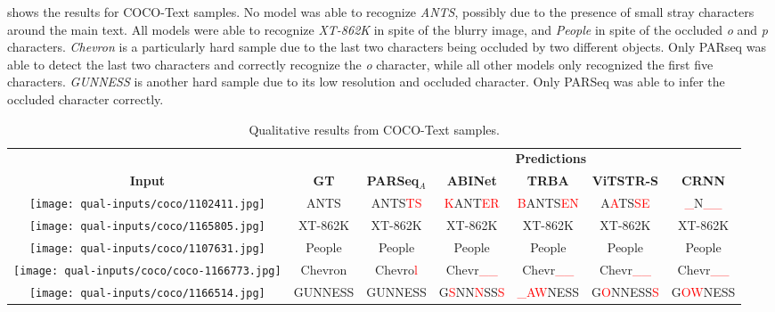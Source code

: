  shows the results for COCO-Text samples. No model was able to recognize \textit{ANTS}, possibly due to the presence of small stray characters around the main text. All models were able to recognize \textit{XT-862K} in spite of the blurry image, and \textit{People} in spite of the occluded \textit{o} and \textit{p} characters. \textit{Chevron} is a particularly hard sample due to the last two characters being occluded by two different objects. Only PARseq was able to detect the last two characters and correctly recognize the \textit{o} character, while all other models only recognized the first five characters. \textit{GUNNESS} is another hard sample due to its low resolution and occluded character. Only PARSeq was able to infer the occluded character correctly.

\begin{table*}[htb]
  \centering
  \scriptsize
  \setlength\tabcolsep{3pt}
  \caption{Qualitative results from COCO-Text samples.}
  \begin{tabular}{ c c c c c c c }
    \toprule
    & & \multicolumn{5}{c}{\textbf{Predictions}} \\
    \cmidrule{3-7}
    \textbf{Input} & \textbf{GT} & \textbf{PARSeq$_A$} & \textbf{ABINet} & \textbf{TRBA} & \textbf{ViTSTR-S} & \textbf{CRNN} \\
    \midrule
    \texttt{[image: qual-inputs/coco/1102411.jpg]} & ANTS & ANTS\textcolor{red}{TS} & \textcolor{red}{K}ANT\textcolor{red}{ER} & \textcolor{red}{B}ANTS\textcolor{red}{EN} & A\textcolor{red}{A}TS\textcolor{red}{SE} & 
    \textcolor{red}{\_}N\textcolor{red}{\_\_} \\
    \texttt{[image: qual-inputs/coco/1165805.jpg]} & XT-862K & XT-862K & XT-862K & XT-862K & XT-862K & XT-862K \\
    \texttt{[image: qual-inputs/coco/1107631.jpg]} & People & People & People & People & People & People \\
    \texttt{[image: qual-inputs/coco/coco-1166773.jpg]} & Chevron & Chevro\textcolor{red}{l} & Chevr\textcolor{red}{\_\_} & Chevr\textcolor{red}{\_\_} & Chevr\textcolor{red}{\_\_} & Chevr\textcolor{red}{\_\_} \\
    \texttt{[image: qual-inputs/coco/1166514.jpg]} & GUNNESS & GUNNESS & G\textcolor{red}{S}NN\textcolor{red}{N}SS\textcolor{red}{S} & \textcolor{red}{\_AW}NESS & G\textcolor{red}{O}NNESS\textcolor{red}{S} & G\textcolor{red}{OW}NESS \\
    \bottomrule
  \end{tabular}
  \label{tab:qual-results-coco}
\end{table*}

